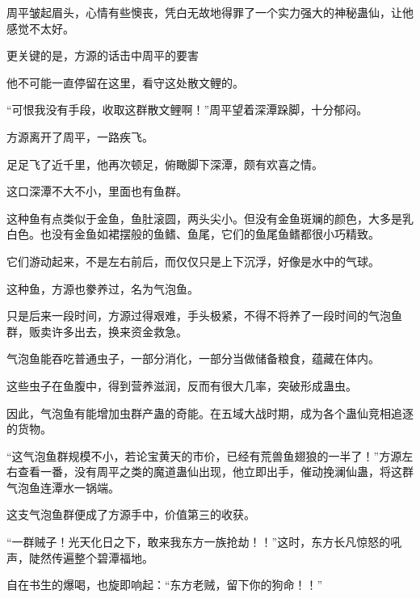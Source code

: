 \begin{this_body}
周平皱起眉头，心情有些懊丧，凭白无故地得罪了一个实力强大的神秘蛊仙，让他感觉不太好。

更关键的是，方源的话击中周平的要害

他不可能一直停留在这里，看守这处散文鲤的。

“可恨我没有手段，收取这群散文鲤啊！”周平望着深潭跺脚，十分郁闷。

方源离开了周平，一路疾飞。

足足飞了近千里，他再次顿足，俯瞰脚下深潭，颇有欢喜之情。

这口深潭不大不小，里面也有鱼群。

这种鱼有点类似于金鱼，鱼肚滚圆，两头尖小。但没有金鱼斑斓的颜色，大多是乳白色。也没有金鱼如裙摆般的鱼鳍、鱼尾，它们的鱼尾鱼鳍都很小巧精致。

它们游动起来，不是左右前后，而仅仅只是上下沉浮，好像是水中的气球。

这种鱼，方源也豢养过，名为气泡鱼。

只是后来一段时间，方源过得艰难，手头极紧，不得不将养了一段时间的气泡鱼群，贩卖许多出去，换来资金救急。

气泡鱼能吞吃普通虫子，一部分消化，一部分当做储备粮食，蕴藏在体内。

这些虫子在鱼腹中，得到营养滋润，反而有很大几率，突破形成蛊虫。

因此，气泡鱼有能增加虫群产蛊的奇能。在五域大战时期，成为各个蛊仙竞相追逐的货物。

“这气泡鱼群规模不小，若论宝黄天的市价，已经有荒兽鱼翅狼的一半了！”方源左右查看一番，没有周平之类的魔道蛊仙出现，他立即出手，催动挽澜仙蛊，将这群气泡鱼连潭水一锅端。

这支气泡鱼群便成了方源手中，价值第三的收获。

“一群贼子！光天化日之下，敢来我东方一族抢劫！！”这时，东方长凡惊怒的吼声，陡然传遍整个碧潭福地。

自在书生的爆喝，也旋即响起：“东方老贼，留下你的狗命！！”

\end{this_body}

